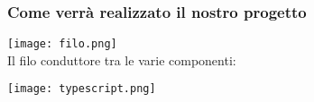 \begin{frame}
  \frametitle{Come verrà realizzato il nostro progetto}
  \centering
  \texttt{[image: filo.png]} \\
  Il filo conduttore tra le varie componenti:
  
  \texttt{[image: typescript.png]}
\end{frame}
